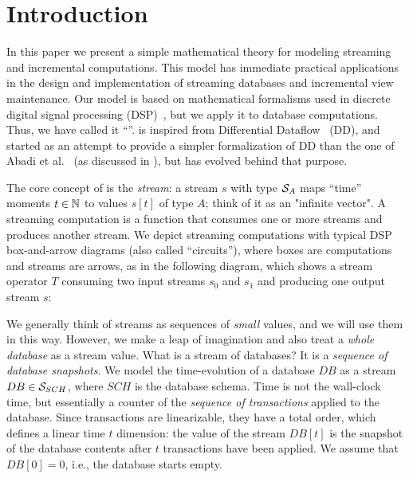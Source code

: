 \section{Introduction}\label{sec:ntro}

In this paper we present a simple mathematical theory for modeling
streaming and incremental computations.  This model has immediate
practical applications in the design and implementation of streaming databases
and incremental view maintenance.  Our model is based on mathematical formalisms 
used in discrete digital signal processing (DSP)~\cite{rabiner-book75},
but we apply it to database computations.  
Thus, we have called it ``\dbsp''.  \dbsp is inspired from Differential 
Dataflow~\cite{mcsherry-cidr13} (DD), and started as an attempt to provide a simpler
formalization of DD than the one of Abadi et al.~\cite{abadi-fossacs15} 
(as discussed in ), but has evolved behind that purpose.

The core concept of \dbsp is the \emph{stream}: a stream $s$ with type 
$\mathcal{S}_{A}$ maps ``time'' moments $t\in\mathbb{N}$ 
to values $s[t]$ of type $A$; think of it as an "infinite vector".
A streaming computation is a function that
consumes one or more streams and produces another stream.  We depict
streaming computations with typical DSP box-and-arrow diagrams (also called ``circuits''),
where boxes are computations and streams are arrows, as in the following diagram,
which shows a stream operator $T$ consuming two input streams $s_0$ and $s_1$ 
and producing one output stream $s$:

\begin{center}
\vspace{-.2cm}
\end{center}

We generally think of streams as sequences of \emph{small} values,
and we will use them in this way.
However, we make a leap of imagination and also treat a \emph{whole database} as a stream value.
What is a stream of databases?  It is a \emph{sequence of database
snapshots}.  We model the time-evolution of a database $DB$ as a
stream $DB \in \mathcal{S}_{SCH}$, where $SCH$ is the database schema.
Time is not the wall-clock time, but essentially a counter
of the \emph{sequence of transactions} applied to the database. 
Since transactions are linearizable,
they have a total order, which defines a linear time $t$ dimension:
the value of the stream $DB[t]$ is the snapshot of the 
database contents after $t$ transactions have been applied.  We assume that $DB[0] = 0$, i.e., the database starts empty.

